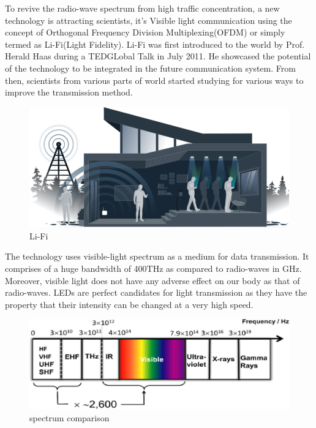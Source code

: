 \documentclass{article}
\begin{document}
To revive the radio-wave spectrum from high traffic concentration, a new technology is attracting scientists, it's Visible light communication using the concept of Orthogonal Frequency Division Multiplexing(OFDM) or simply termed as Li-Fi(Light Fidelity).\newline
Li-Fi was first introduced to the world by Prof. Herald Haas during a TEDGLobal Talk in July 2011. He showcased the potential of the technology to be integrated in the future communication system. From then, scientists from various parts of world started studying for various ways to improve the transmission method.\\
\begin{figure}[!h]
  \includegraphics[width=\linewidth]{res/tech-illustration-li-fi.png}
    \caption{Li-Fi}
  \label{fig:tech-illustration-li-fi}
\end{figure}

The technology uses visible-light spectrum as a medium for data transmission. It comprises of a huge bandwidth of 400THz as compared to radio-waves in GHz. Moreover, visible light does not have any adverse effect on our body as that of radio-waves. LEDs are perfect candidates for light transmission as they have the property that their intensity can be changed at a very high speed.

\begin{figure}[!h]
  \includegraphics[width=\linewidth]{res/spectrum_li_fi.jpg}
    \caption{spectrum comparison}
  \label{fig:spectrum_li_fi}
\end{figure}
\end{document}
